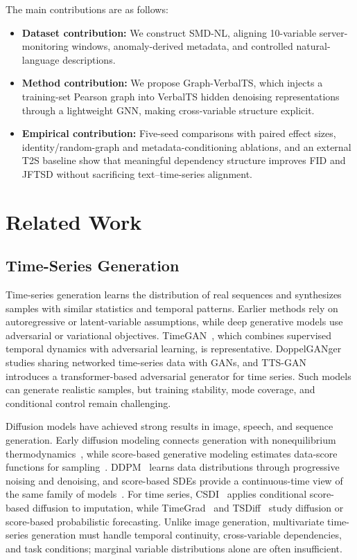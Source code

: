 \documentclass[conference]{IEEEtran}
\begin{document}
The main contributions are as follows:
\begin{itemize}
    \item \textbf{Dataset contribution:} We construct SMD-NL, aligning 10-variable server-monitoring windows, anomaly-derived metadata, and controlled natural-language descriptions.
    \item \textbf{Method contribution:} We propose Graph-VerbalTS, which injects a training-set Pearson graph into VerbalTS hidden denoising representations through a lightweight GNN, making cross-variable structure explicit.
    \item \textbf{Empirical contribution:} Five-seed comparisons with paired effect sizes, identity/random-graph and metadata-conditioning ablations, and an external T2S baseline show that meaningful dependency structure improves FID and JFTSD without sacrificing text--time-series alignment.
\end{itemize}

\section{Related Work}

\subsection{Time-Series Generation}

Time-series generation learns the distribution of real sequences and synthesizes samples with similar statistics and temporal patterns. Earlier methods rely on autoregressive or latent-variable assumptions, while deep generative models use adversarial or variational objectives. TimeGAN~\cite{yoon2019timegan}, which combines supervised temporal dynamics with adversarial learning, is representative. DoppelGANger~\cite{lin2020doppelganger} studies sharing networked time-series data with GANs, and TTS-GAN~\cite{li2022ttsgan} introduces a transformer-based adversarial generator for time series. Such models can generate realistic samples, but training stability, mode coverage, and conditional control remain challenging.

Diffusion models have achieved strong results in image, speech, and sequence generation. Early diffusion modeling connects generation with nonequilibrium thermodynamics~\cite{sohl2015nonequilibrium}, while score-based generative modeling estimates data-score functions for sampling~\cite{song2019score}. DDPM~\cite{ho2020ddpm} learns data distributions through progressive noising and denoising, and score-based SDEs provide a continuous-time view of the same family of models~\cite{song2021sde}. For time series, CSDI~\cite{tashiro2021csdi} applies conditional score-based diffusion to imputation, while TimeGrad~\cite{rasul2021timegrad} and TSDiff~\cite{kollovieh2023tsdiff} study diffusion or score-based probabilistic forecasting. Unlike image generation, multivariate time-series generation must handle temporal continuity, cross-variable dependencies, and task conditions; marginal variable distributions alone are often insufficient.
\end{document}
